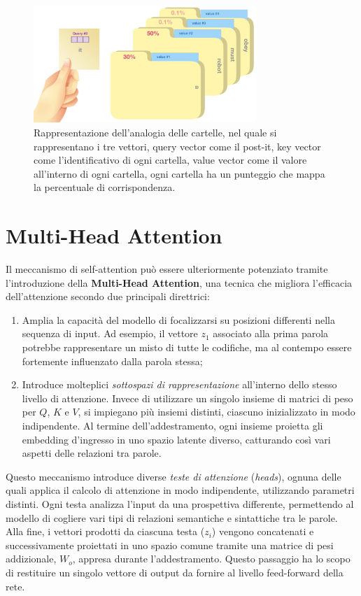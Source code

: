 \begin{figure}
    \centering
    \includegraphics[width=0.75\textwidth]{figure/FoldeAnalogy.png}
    \caption{Rappresentazione dell'analogia delle cartelle, nel quale si rappresentano i tre vettori, query vector come il post-it, key vector come l'identificativo di ogni cartella, value vector come il valore all'interno di ogni cartella, ogni cartella ha un punteggio che mappa la percentuale di corrispondenza.}
    \label{fig:folderAn}
\end{figure}

\section{Multi-Head Attention}

Il meccanismo di self-attention può essere ulteriormente potenziato tramite l'introduzione della \textbf{Multi-Head Attention}, una tecnica che migliora l'efficacia dell'attenzione secondo due principali direttrici:

\begin{enumerate}
\item Amplia la capacità del modello di focalizzarsi su posizioni differenti nella sequenza di input. Ad esempio, il vettore $z_1$ associato alla prima parola potrebbe rappresentare un misto di tutte le codifiche, ma al contempo essere fortemente influenzato dalla parola stessa;
\item Introduce molteplici \emph{sottospazi di rappresentazione} all'interno dello stesso livello di attenzione. Invece di utilizzare un singolo insieme di matrici di peso per $Q$, $K$ e $V$, si impiegano più insiemi distinti, ciascuno inizializzato in modo indipendente. Al termine dell’addestramento, ogni insieme proietta gli embedding d’ingresso in uno spazio latente diverso, catturando così vari aspetti delle relazioni tra parole.
\end{enumerate}

Questo meccanismo introduce diverse \emph{teste di attenzione} (\emph{heads}), ognuna delle quali applica il calcolo di attenzione in modo indipendente, utilizzando parametri distinti. Ogni testa analizza l’input da una prospettiva differente, permettendo al modello di cogliere vari tipi di relazioni semantiche e sintattiche tra le parole. Alla fine, i vettori prodotti da ciascuna testa ($z_i$) vengono concatenati e successivamente proiettati in uno spazio comune tramite una matrice di pesi addizionale, $W_o$, appresa durante l’addestramento. Questo passaggio ha lo scopo di restituire un singolo vettore di output da fornire al livello feed-forward della rete.

